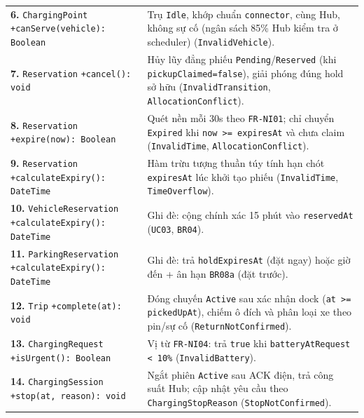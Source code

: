 {\begin{longtable}{>{\raggedright\arraybackslash}p{4.3cm} >{\raggedright\arraybackslash}p{10.0cm}}
\textbf{6.} \texttt{ChargingPoint} \newline \texttt{+canServe(vehicle): Boolean} & Trụ \texttt{Idle}, khớp chuẩn \texttt{connector}, cùng Hub, không sự cố (ngân sách 85\% Hub kiểm tra ở scheduler) (\texttt{InvalidVehicle}). \\
\textbf{7.} \texttt{Reservation} \newline \texttt{+cancel(): void} & Hủy lũy đẳng phiếu \texttt{Pending}/\texttt{Reserved} (khi \texttt{pickupClaimed=false}), giải phóng đúng hold sở hữu (\texttt{InvalidTransition}, \texttt{AllocationConflict}). \\
\textbf{8.} \texttt{Reservation} \newline \texttt{+expire(now): Boolean} & Quét nền mỗi 30s theo \texttt{FR-NI01}; chỉ chuyển \texttt{Expired} khi \texttt{now >= expiresAt} và chưa claim (\texttt{InvalidTime}, \texttt{AllocationConflict}). \\
\textbf{9.} \texttt{Reservation} \newline \texttt{+calculateExpiry(): DateTime} & Hàm trừu tượng thuần túy tính hạn chót \texttt{expiresAt} lúc khởi tạo phiếu (\texttt{InvalidTime}, \texttt{TimeOverflow}). \\
\textbf{10.} \texttt{VehicleReservation} \newline \texttt{+calculateExpiry(): DateTime} & Ghi đè: cộng chính xác 15 phút vào \texttt{reservedAt} (\texttt{UC03}, \texttt{BR04}). \\
\textbf{11.} \texttt{ParkingReservation} \newline \texttt{+calculateExpiry(): DateTime} & Ghi đè: trả \texttt{holdExpiresAt} (đặt ngay) hoặc giờ đến + ân hạn \texttt{BR08a} (đặt trước). \\
\textbf{12.} \texttt{Trip} \newline \texttt{+complete(at): void} & Đóng chuyến \texttt{Active} sau xác nhận dock (\texttt{at >= pickedUpAt}), chiếm ô đích và phân loại xe theo pin/sự cố (\texttt{ReturnNotConfirmed}). \\
\textbf{13.} \texttt{ChargingRequest} \newline \texttt{+isUrgent(): Boolean} & Vị từ \texttt{FR-NI04}: trả \texttt{true} khi \texttt{batteryAtRequest < 10\%} (\texttt{InvalidBattery}). \\
\textbf{14.} \texttt{ChargingSession} \newline \texttt{+stop(at, reason): void} & Ngắt phiên \texttt{Active} sau ACK điện, trả công suất Hub; cập nhật yêu cầu theo \texttt{ChargingStopReason} (\texttt{StopNotConfirmed}). \\

\end{longtable}}
